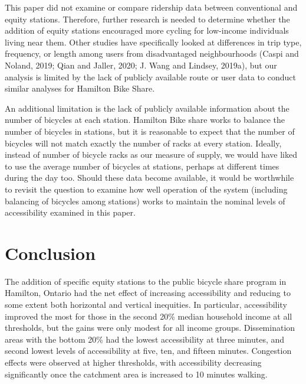 \documentclass[]{elsarticle} %
\begin{document}
This paper did not examine or compare ridership data between
conventional and equity stations. Therefore, further research is needed
to determine whether the addition of equity stations encouraged more
cycling for low-income individuals living near them. Other studies have
specifically looked at differences in trip type, frequency, or length
among users from disadvantaged neighbourhoods (Caspi and Noland, 2019;
Qian and Jaller, 2020; J. Wang and Lindsey, 2019a), but our analysis is
limited by the lack of publicly available route or user data to conduct
similar analyses for Hamilton Bike Share.

An additional limitation is the lack of publicly available information
about the number of bicycles at each station. Hamilton Bike share works
to balance the number of bicycles in stations, but it is reasonable to
expect that the number of bicycles will not match exactly the number of
racks at every station. Ideally, instead of number of bicycle racks as
our measure of supply, we would have liked to use the average number of
bicycles at stations, perhaps at different times during the day too.
Should these data become available, it would be worthwhile to revisit
the question to examine how well operation of the system (including
balancing of bicycles among stations) works to maintain the nominal
levels of accessibility examined in this paper.

\hypertarget{conclusion}{%
\section{Conclusion}\label{conclusion}}

The addition of specific equity stations to the public bicycle share
program in Hamilton, Ontario had the net effect of increasing
accessibility and reducing to some extent both horizontal and vertical
inequities. In particular, accessibility improved the most for those in
the second 20\% median household income at all thresholds, but the gains
were only modest for all income groups. Dissemination areas with the
bottom 20\% had the lowest accessibility at three minutes, and second
lowest levels of accessibility at five, ten, and fifteen minutes.
Congestion effects were observed at higher thresholds, with
accessibility decreasing significantly once the catchment area is
increased to 10 minutes walking.
\end{document}
